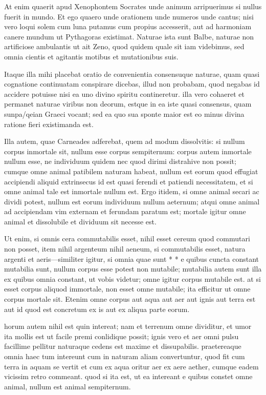  At enim quaerit apud Xenophontem Socrates unde animum arripuerimus si nullus fuerit in mundo. Et ego quaero unde orationem unde numeros unde cantus; nisi vero loqui solem cum luna putamus cum propius accesserit, aut ad harmoniam canere mundum ut Pythagoras existimat. Naturae ista sunt Balbe, naturae non artificiose ambulantis ut ait Zeno, quod quidem quale sit iam videbimus, sed omnia cientis et agitantis motibus et mutationibus suis.

 Itaque illa mihi placebat oratio de convenientia consensuque naturae, quam quasi cognatione continuatam conspirare dicebas, illud non probabam, quod negabas id accidere potuisse nisi ea uno divino spiritu contineretur. illa vero cohaeret et permanet naturae viribus non deorum, estque in ea iste quasi consensus, quam sunpa/qeian Graeci vocant; sed ea quo sua sponte maior est eo minus divina ratione fieri existimanda est.

 Illa autem, quae Carneades adferebat, quem ad modum dissolvitis: si nullum corpus inmortale sit, nullum esse corpus sempiternum: corpus autem inmortale nullum esse, ne individuum quidem nec quod dirimi distrahive non possit; cumque omne animal patibilem naturam habeat, nullum est eorum quod effugiat accipiendi aliquid extrinsecus id est quasi ferendi et patiendi necessitatem, et si omne animal tale est inmortale nullum est. Ergo itidem, si omne animal secari ac dividi potest, nullum est eorum individuum nullum aeternum; atqui omne animal ad accipiendam vim externam et ferundam paratum est; mortale igitur omne animal et dissolubile et dividuum sit necesse est.

 Ut enim, si omnis cera commutabilis esset, nihil esset cereum quod commutari non posset, item nihil argenteum nihil aeneum, si commutabilis esset, natura argenti et aeris—similiter igitur, si omnia quae sunt * * e quibus cuncta constant mutabilia sunt, nullum corpus esse potest non mutabile; mutabilia autem sunt illa ex quibus omnia constant, ut vobis videtur; omne igitur corpus mutabile est. at si esset corpus aliquod immortale, non esset omne mutabile; ita efficitur ut omne corpus mortale sit. Etenim omne corpus aut aqua aut aer aut ignis aut terra est aut id quod est concretum ex is aut ex aliqua parte eorum.

 horum autem nihil est quin intereat; nam et terrenum omne dividitur, et umor ita mollis est ut facile premi conlidique possit; ignis vero et aer omni pulsu facillime pellitur naturaque cedens est maxime et dissupabilis. praetereaque omnia haec tum intereunt cum in naturam aliam convertuntur, quod fit cum terra in aquam se vertit et cum ex aqua oritur aer ex aere aether, cumque eadem vicissim retro commeant. quod si ita est, ut ea intereant e quibus constet omne animal, nullum est animal sempiternum.

